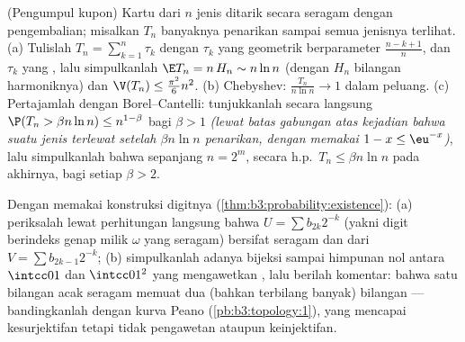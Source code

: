\begin{exercise}[$\star\star\star$]\label{exo:b3:probability:9}
(Pengumpul kupon) Kartu dari $n$ jenis ditarik secara seragam
dengan pengembalian; misalkan $T_n$ banyaknya penarikan sampai semua
jenisnya terlihat.
(a) Tulislah $T_n = \sum_{k=1}^{n}\tau_k$ dengan $\tau_k$ yang
geometrik berparameter $\frac{n - k + 1}n$, dan $\tau_k$ yang
, lalu simpulkanlah $\E T_n = n\,H_n \sim n\ln n$
(dengan $H_n$ bilangan harmoniknya) dan $\V(T_n) \leq
\frac{\pi^2}6n^2$.
(b) Chebyshev: $\frac{T_n}{n\ln n} \to 1$ dalam peluang.
(c) Pertajamlah dengan Borel--Cantelli: tunjukkanlah secara langsung $\P(T_n >
\beta n\ln n) \leq n^{1 - \beta}$ bagi $\beta > 1$
\emph{(lewat batas gabungan atas kejadian bahwa suatu jenis terlewat
setelah $\beta n\ln n$ penarikan, dengan memakai $1 - x \leq \eu^{-x}$)},
lalu simpulkanlah bahwa sepanjang $n = 2^m$, secara h.p.\ $T_n \leq \beta n\ln
n$ pada akhirnya, bagi setiap $\beta > 2$.
\end{exercise}

\begin{exercise}[$\star\star$]\label{exo:b3:probability:10}
Dengan memakai konstruksi digitnya
(\cref{thm:b3:probability:existence}):
(a) periksalah lewat perhitungan langsung bahwa $U = \sum b_{2k}2^{-k}$
(yakni digit berindeks genap milik $\omega$ yang seragam) bersifat seragam dan
 dari $V = \sum b_{2k-1}2^{-k}$;
(b) simpulkanlah adanya bijeksi  sampai himpunan nol antara
$\intcc01$ dan $\intcc01^2$ yang mengawetkan , lalu berilah komentar:
bahwa satu bilangan acak seragam memuat dua (bahkan terbilang banyak)
bilangan  --- bandingkanlah dengan kurva Peano
(\cref{pb:b3:topology:1}), yang mencapai kesurjektifan tetapi
tidak pengawetan  ataupun keinjektifan.
\end{exercise}

